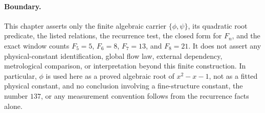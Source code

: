 \paragraph{Boundary.}
This chapter asserts only the finite algebraic carrier $\{\phi,\psi\}$, its quadratic root predicate, the listed relations, the recurrence test, the closed form for $F_n$, and the exact window counts $F_5=5$, $F_6=8$, $F_7=13$, and $F_8=21$. It does not assert any physical-constant identification, global flow law, external dependency, metrological comparison, or interpretation beyond this finite construction. In particular, $\phi$ is used here as a proved algebraic root of $x^2-x-1$, not as a fitted physical constant, and no conclusion involving a fine-structure constant, the number $137$, or any measurement convention follows from the recurrence facts alone.
